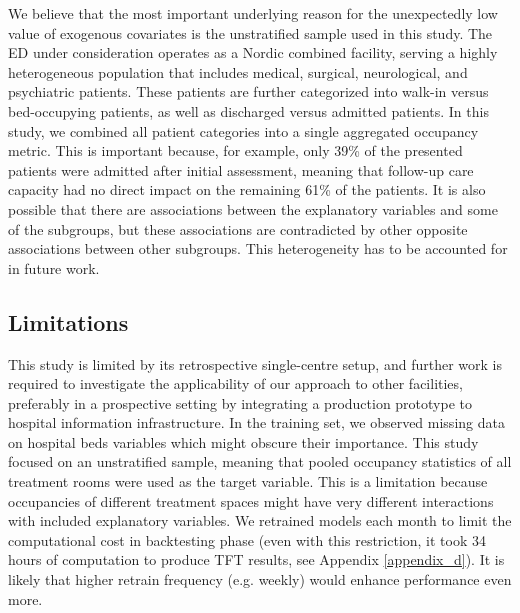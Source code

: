 We believe that the most important underlying reason for the unexpectedly low value of exogenous covariates is the unstratified sample used in this study. The ED under consideration operates as a Nordic combined facility, serving a highly heterogeneous population that includes medical, surgical, neurological, and psychiatric patients. These patients are further categorized into walk-in versus bed-occupying patients, as well as discharged versus admitted patients. In this study, we combined all patient categories into a single aggregated occupancy metric. This is important because, for example, only 39\% of the presented patients were admitted after initial assessment, meaning that follow-up care capacity had no direct impact on the remaining 61\% of the patients. It is also possible that there are associations between the explanatory variables and some of the subgroups, but these associations are contradicted by other opposite associations between other subgroups. This heterogeneity has to be accounted for in future work.

\subsection{Limitations}
This study is limited by its retrospective single-centre setup, and further work is required to investigate the applicability of our approach to other facilities, preferably in a prospective setting by integrating a production prototype to hospital information infrastructure. In the training set, we observed missing data on hospital beds variables which might obscure their importance. This study focused on an unstratified sample, meaning that pooled occupancy statistics of all treatment rooms were used as the target variable. This is a limitation because occupancies of different treatment spaces might have very different interactions with included explanatory variables. We retrained models each month to limit the computational cost in backtesting phase (even with this restriction, it took 34 hours of computation to produce TFT results, see Appendix \ref{appendix_d}). It is likely that higher retrain frequency (e.g. weekly) would enhance performance even more.